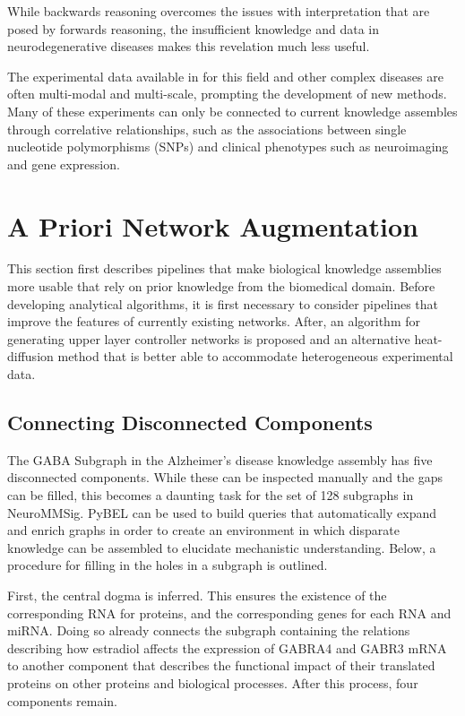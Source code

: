 While backwards reasoning overcomes the issues with interpretation that are posed by forwards reasoning, the insufficient knowledge and data in neurodegenerative diseases makes this revelation much less useful. 

The experimental data available in for this field and other complex diseases are often multi-modal and multi-scale, prompting the development of new methods. Many of these experiments can only be connected to current knowledge assembles through correlative relationships, such as the associations between single nucleotide polymorphisms (\ac{SNP}s) and clinical phenotypes such as neuroimaging and gene expression. 

\section{A Priori Network Augmentation}

This section first describes pipelines that make biological knowledge assemblies more usable that rely on prior knowledge from the biomedical domain. Before developing analytical algorithms, it is first necessary to consider pipelines that improve the features of currently existing networks. After, an algorithm for generating upper layer controller networks is proposed and an alternative heat-diffusion method that is better able to accommodate heterogeneous experimental data. 

\subsection{Connecting Disconnected Components}

The GABA Subgraph in the Alzheimer's disease knowledge assembly has five disconnected components. While these can be inspected manually and the gaps can be filled, this becomes a daunting task for the set of 128 subgraphs in NeuroMMSig. PyBEL can be used to build queries that automatically expand and enrich graphs in order to create an environment in which disparate knowledge can be assembled to elucidate mechanistic understanding. Below, a procedure for filling in the holes in a subgraph is outlined. 

First, the central dogma is inferred. This ensures the existence of the corresponding RNA for proteins, and the corresponding genes for each \ac{RNA} and \ac{miRNA}. Doing so already connects the subgraph containing the relations describing how estradiol affects the expression of GABRA4 and GABR3 \ac{mRNA} \cite{Noriega2010} to another component that describes the functional impact of their translated proteins on other proteins and biological processes. After this process, four components remain.

